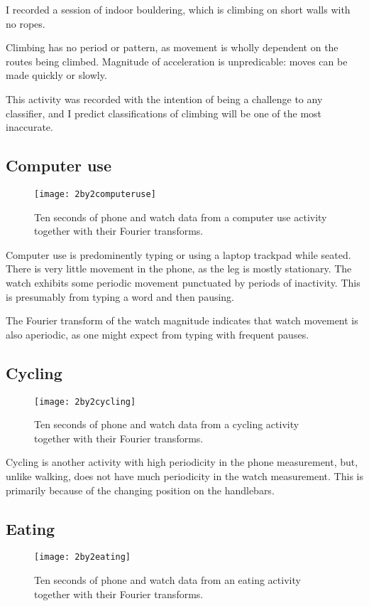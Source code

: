       I recorded a session of indoor bouldering, which is climbing on short walls with no ropes.
      
      Climbing has no period or pattern, as movement is wholly dependent on the routes being climbed. Magnitude of acceleration is unpredicable: moves can be made quickly or slowly.
      
      This activity was recorded with the intention of being a challenge to any classifier, and I predict classifications of climbing will be one of the most inaccurate.
    \subsection{Computer use}
      \begin{figure}[!th]
        \centering
        \texttt{[image: 2by2computeruse]}
        \caption{Ten seconds of phone and watch data from a computer use activity together with their Fourier transforms.}
        \label{fig:2by2computeruse}
      \end{figure}
      
      Computer use is predominently typing or using a laptop trackpad while seated. There is very little movement in the phone, as the leg is mostly   stationary. The watch exhibits some periodic movement punctuated by periods of inactivity. This is presumably from typing a word and then pausing.
      
      The Fourier transform of the watch magnitude indicates that watch movement is also aperiodic, as one might expect from typing with frequent pauses. 
    \subsection{Cycling}
      \begin{figure}[!th]
        \centering
        \texttt{[image: 2by2cycling]}
        \caption{Ten seconds of phone and watch data from a cycling activity together with their Fourier transforms.}
        \label{fig:2by2cycling}
      \end{figure}
      Cycling is another activity with high periodicity in the phone measurement, but, unlike walking, does not have much periodicity in the watch measurement. This is primarily because of the changing position on the handlebars.
    \subsection{Eating}
      \begin{figure}[!th]
        \centering
        \texttt{[image: 2by2eating]}
        \caption{Ten seconds of phone and watch data from an eating activity together with their Fourier transforms.}
        \label{fig:2by2eating}
      \end{figure}
      
